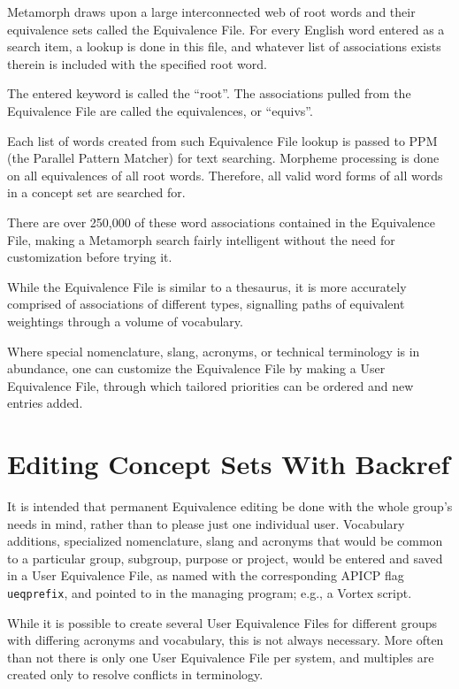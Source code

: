 Metamorph draws upon a large interconnected web of root words and
their equivalence sets called the Equivalence File.  For every English
word entered as a search item, a lookup is done in this file, and
whatever list of associations exists therein is included with the
specified root word.

The entered keyword is called the ``root''.  The associations pulled
from the Equivalence File are called the equivalences, or ``equivs''.

Each list of words created from such Equivalence File lookup is passed
to PPM (the Parallel Pattern Matcher) for text searching.  Morpheme
processing is done on all equivalences of all root words.  Therefore,
all valid word forms of all words in a concept set are searched for.

There are over 250,000 of these word associations contained in the
Equivalence File, making a Metamorph search fairly intelligent without
the need for customization before trying it.

While the Equivalence File is similar to a thesaurus, it is more
accurately comprised of associations of different types, signalling
paths of equivalent weightings through a volume of vocabulary.

Where special nomenclature, slang, acronyms, or technical terminology
is in abundance, one can customize the Equivalence File by making a
User Equivalence File, through which tailored priorities can be
ordered and new entries added.

\section{Editing Concept Sets With Backref}

It is intended that permanent Equivalence editing be done with the
whole group's needs in mind, rather than to please just one individual
user.  Vocabulary additions, specialized nomenclature, slang and
acronyms that would be common to a particular group, subgroup, purpose
or project, would be entered and saved in a User Equivalence File, as
named with the corresponding APICP flag \verb`ueqprefix`, and pointed
to in the managing program; e.g., a Vortex script.

While it is possible to create several User Equivalence Files for
different groups with differing acronyms and vocabulary, this is not
always necessary.  More often than not there is only one User
Equivalence File per system, and multiples are created only to resolve
conflicts in terminology.

